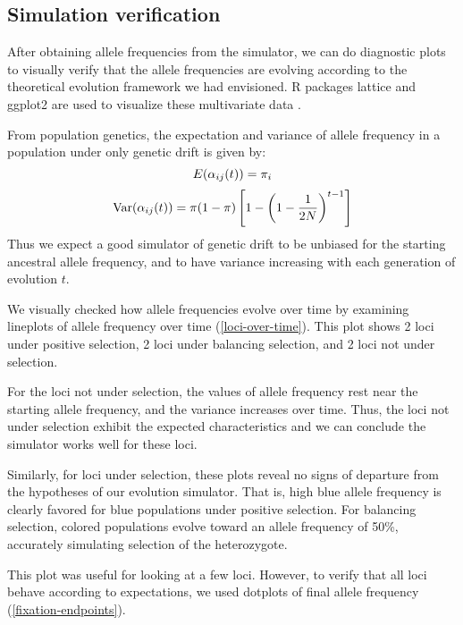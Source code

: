 \documentclass[a4paper,12pt]{article}
\begin{document}
\subsection{Simulation verification}

After obtaining allele frequencies from the simulator, we can do
diagnostic plots to visually verify that the allele frequencies are
evolving according to the theoretical evolution framework we had
envisioned. R packages lattice and ggplot2 are used to visualize these
multivariate data \cite{lattice,ggplot2}.

From population genetics, the expectation and variance of allele
frequency in a population under only genetic drift is given by:
$$E(\alpha_{ij}(t))=\pi_i$$
$$\operatorname{Var}(\alpha_{ij}(t))=\pi(1-\pi)\left[1-\left(1-\frac{1}{2N}\right)^{t-1}\right]$$
Thus we expect a good simulator of genetic drift to be unbiased for
the starting ancestral allele frequency, and to have variance
increasing with each generation of evolution $t$.

We visually checked how allele frequencies evolve over time by
examining lineplots of allele frequency over time
(\autoref{loci-over-time}). This plot shows 2 loci under positive
selection, 2 loci under balancing selection, and 2 loci not under
selection.


For the loci not under selection, the values of allele frequency rest
near the starting allele frequency, and the variance increases over
time. Thus, the loci not under selection exhibit the expected
characteristics and we can conclude the simulator works well for these
loci.

Similarly, for loci under selection, these plots reveal no signs of
departure from the hypotheses of our evolution simulator. That is,
high blue allele frequency is clearly favored for blue populations
under positive selection. For balancing selection, colored populations
evolve toward an allele frequency of 50\%, accurately simulating
selection of the heterozygote.

This plot was useful for looking at a few loci. However, to verify
that all loci behave according to expectations, we used dotplots of
final allele frequency (\autoref{fixation-endpoints}).
\end{document}
